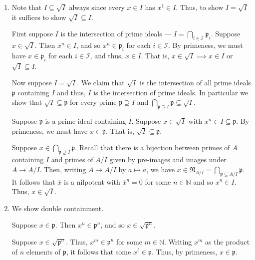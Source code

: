\documentclass[12 pt, letterpaper]{hmcpset}
\begin{document}
\begin{solution}
	\begin{enumerate}
		\item Note that $I \subseteq \sqrt{I}$ always since every $x \in I$ has $x^{1} \in I$. Thus, to show $I = \sqrt{I}$ it suffices to show $\sqrt{I} \subseteq I$.

			First suppose $I$ is the intersection of prime ideals --- $I = \bigcap_{i \in \mathscr{I}} \mathfrak{p}_{i}$. Suppose $x \in \sqrt{I}$. Then $x^{n} \in I$, and so $x^{n} \in \mathfrak{p}_{i}$ for each $i \in \mathscr{I}$. By primeness, we must have $x \in \mathfrak{p}_{i}$ for each $i \in \mathscr{I}$, and thus, $x \in I$. That is, $x \in \sqrt{I} \implies x \in I$ or $\sqrt{I} \subseteq I$.

			Now suppose $I = \sqrt{I}$. We claim that $\sqrt{I}$ is the intersection of all prime ideals $\mathfrak{p}$ containing $I$ and thus, $I$ is the intersection of prime ideals. In particular we show that $\sqrt{I} \subseteq \mathfrak{p}$ for every prime $\mathfrak{p} \supseteq I$ and $\bigcap_{\mathfrak{p} \supseteq I} \mathfrak{p} \subseteq \sqrt{I}$.

			Suppose $\mathfrak{p}$ is a prime ideal containing $I$. Suppose $x \in \sqrt{I}$ with $x^{n} \in I \subseteq \mathfrak{p}$. By primeness, we must have $x \in \mathfrak{p}$. That is, $\sqrt{I} \subseteq \mathfrak{p}$.

			Suppose $x \in \bigcap_{\mathfrak{p} \supseteq I} \mathfrak{p}$. Recall that there is a bijection between primes of $A$ containing $I$ and primes of $A / I$ given by pre-images and images under $A \to A / I$. Then, writing $A \to A / I$ by $a \mapsto \overline{a}$, we have $\overline{x} \in \mathfrak{N}_{A / I} = \bigcap_{\mathfrak{p} \subseteq A / I} \mathfrak{p}$. It follows that $\overline{x}$ is a nilpotent with $\overline{x}^{n} = 0$ for some $n \in  \mathbb{N}$ and so $x^{n} \in I$. Thus, $x \in \sqrt{I}$.

		\item We show double containment.

			Suppose $x \in \mathfrak{p}$. Then $x^{n} \in \mathfrak{p}^{n}$, and so $x \in \sqrt{\mathfrak{p}^{n}}$.

			Suppose $x \in \sqrt{\mathfrak{p}^{n}}$. Thus, $x^{m} \in \mathfrak{p}^{n}$ for some $m \in \mathbb{N}$. Writing $x^{m}$ as the product of $n$ elements of $\mathfrak{p}$, it follows that some $x^{\ell} \in \mathfrak{p}$. Thus, by primeness, $x \in \mathfrak{p}$.
	\end{enumerate}
\end{solution}
\end{document}
